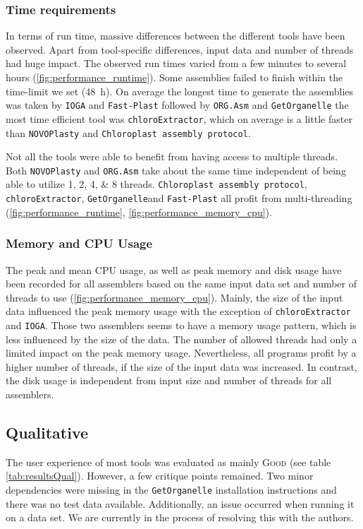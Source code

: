 \documentclass{bmcart}
\newcounter{todocounter}
\newcommand{\ak}[1]
{\stepcounter{todocounter}
 \todo[color=green!40,author=Arthur]{\thetodocounter: #1}
 }
\newcommand{\formatprogramnames}[1]{\texttt{#1}}
\newcommand{\ce}{\formatprogramnames{chloroExtractor}}
\newcommand{\oa}{\formatprogramnames{ORG.Asm}}
\newcommand{\fp}{\formatprogramnames{Fast-Plast}}
\newcommand{\ioga}{\formatprogramnames{IOGA}}
\newcommand{\np}{\formatprogramnames{NOVOPlasty}}
\newcommand{\go}{\formatprogramnames{GetOrganelle}}
\newcommand{\cassp}{\formatprogramnames{Chloroplast assembly protocol}}
\newcommand{\good}{\textsc{Good}}
\begin{document}
\subsubsection*{Time requirements}
In terms of run time, massive differences between the different tools have been observed. Apart from tool-specific differences, input data and number of threads had huge impact. The observed run times varied from a few minutes to several hours (\cref{fig:performance_runtime}).
Some assemblies failed to finish within the time-limit we set (\SI{48}{\hour}). 
On average the longest time to generate the assemblies was taken by \ioga{} and \fp{} followed by \oa{} and \go{} the most time efficient tool was \ce{}, which on average is a little faster than \np{} and \cassp{}.

Not all the tools were able to benefit from having access to multiple threads. Both \np{} and \oa{} take about the same time independent of being able to utilize \numlist[list-final-separator={, or }]{1;2;4;8} threads. \cassp{}, \ce{}, \go  and \fp{} all profit from multi-threading (\cref{fig:performance_runtime}, \cref{fig:performance_memory_cpu}).

\subsubsection*{Memory and CPU Usage }
The peak and mean CPU usage, as well as peak memory and disk usage have been recorded for all assemblers based on the same input data set and number of threads to use (\cref{fig:performance_memory_cpu}).
Mainly, the size of the input data influenced the peak memory usage with the exception of \ce{} and \ioga{}.
Those two assemblers seems to have a memory usage pattern, which is less influenced by the size of the data.
The number of allowed threads had only a limited impact on the peak memory usage.
Nevertheless, all programs profit by a higher number of threads, if the size of the input data was increased.
In contrast, the disk usage is independent from input size and number of threads for all assemblers.

\subsection*{Qualitative}
The user experience of most tools was evaluated as mainly \good{} (see table \ref{tab:resultsQual}). However, a few critique points remained.
Two minor dependencies were missing in the \go{} installation instructions and there was no test data available. Additionally, an issue occurred when running it on a  data set. We are currently in the process of resolving this with the authors.
\end{document}
